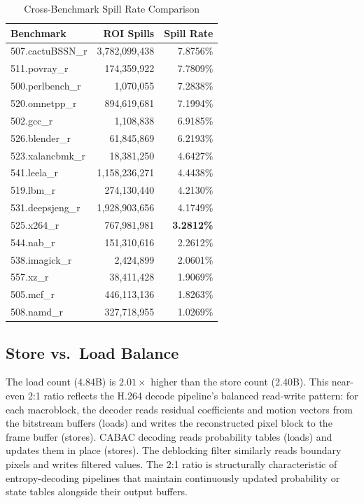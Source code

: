 \documentclass[conference]{IEEEtran}
\begin{document}
\begin{table}[H]
\centering
\caption{Cross-Benchmark Spill Rate Comparison}
\label{tab:compare}
\begin{tabular}{lrr}
\toprule
\textbf{Benchmark} & \textbf{ROI Spills} & \textbf{Spill Rate} \\
\midrule
507.cactuBSSN\_r & 3,782,099,438 & 7.8756\% \\
511.povray\_r    &   174,359,922 & 7.7809\% \\
500.perlbench\_r &     1,070,055 & 7.2838\% \\
520.omnetpp\_r   &   894,619,681 & 7.1994\% \\
502.gcc\_r       &     1,108,838 & 6.9185\% \\
526.blender\_r   &    61,845,869 & 6.2193\% \\
523.xalancbmk\_r &    18,381,250 & 4.6427\% \\
541.leela\_r     & 1,158,236,271 & 4.4438\% \\
519.lbm\_r       &   274,130,440 & 4.2130\% \\
531.deepsjeng\_r & 1,928,903,656 & 4.1749\% \\
525.x264\_r      &   767,981,981 & \textbf{3.2812\%} \\
544.nab\_r       &   151,310,616 & 2.2612\% \\
538.imagick\_r   &     2,424,899 & 2.0601\% \\
557.xz\_r        &    38,411,428 & 1.9069\% \\
505.mcf\_r       &   446,113,136 & 1.8263\% \\
508.namd\_r      &   327,718,955 & 1.0269\% \\
\bottomrule
\end{tabular}
\end{table}

\subsection{Store vs.\ Load Balance}

The load count (4.84B) is $2.01\times$ higher than the store count
(2.40B). This near-even 2:1 ratio reflects the H.264 decode pipeline's
balanced read-write pattern: for each macroblock, the decoder reads
residual coefficients and motion vectors from the bitstream buffers
(loads) and writes the reconstructed pixel block to the frame buffer
(stores). CABAC decoding reads probability tables (loads) and updates
them in place (stores). The deblocking filter similarly reads boundary
pixels and writes filtered values. The 2:1 ratio is structurally
characteristic of entropy-decoding pipelines that maintain
continuously updated probability or state tables alongside their
output buffers.
\end{document}
